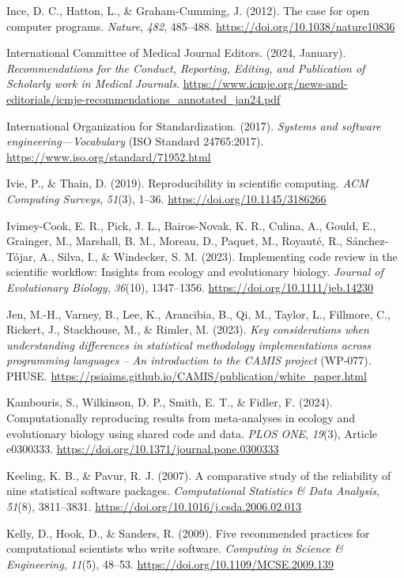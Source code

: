 \documentclass[authordate, meta]{jote-new-article}
\begin{document}
	Ince, D. C., Hatton, L., \& Graham-Cumming, J. (2012). The case for open computer programs. \emph{Nature}, \emph{482}, 485--488. \url{https://doi.org/10.1038/nature10836}


	International Committee of Medical Journal Editors. (2024, January). \emph{Recommendations for the Conduct, Reporting, Editing, and Publication of Scholarly work in Medical Journals}. \url{https://www.icmje.org/news-and-editorials/icmje-recommendations\_annotated\_jan24.pdf}


	International Organization for Standardization. (2017). \emph{Systems and software engineering—Vocabulary} (ISO Standard 24765:2017). \url{https://www.iso.org/standard/71952.html}


	Ivie, P., \& Thain, D. (2019). Reproducibility in scientific computing. \emph{ACM Computing Surveys}, \emph{51}(3), 1--36. \url{https://doi.org/10.1145/3186266}


	Ivimey-Cook, E. R., Pick, J. L., Bairos-Novak, K. R., Culina, A., Gould, E., Grainger, M., Marshall, B. M., Moreau, D., Paquet, M., Royauté, R., Sánchez-Tójar, A., Silva, I., \& Windecker, S. M. (2023). Implementing code review in the scientific workflow: Insights from ecology and evolutionary biology. \emph{Journal of Evolutionary Biology}, \emph{36}(10), 1347--1356. \url{https://doi.org/10.1111/jeb.14230}


	Jen, M.-H., Varney, B., Lee, K., Arancibia, B., Qi, M., Taylor, L., Fillmore, C., Rickert, J., Stackhouse, M., \& Rimler, M. (2023). \emph{Key considerations when understanding differences in statistical methodology implementations across programming languages -- An introduction to the CAMIS project} (WP-077). PHUSE. \url{https://psiaims.github.io/CAMIS/publication/white\_paper.html}


	Kambouris, S., Wilkinson, D. P., Smith, E. T., \& Fidler, F. (2024). Computationally reproducing results from meta-analyses in ecology and evolutionary biology using shared code and data. \emph{PLOS ONE}, \emph{19}(3), Article e0300333. \url{https://doi.org/10.1371/journal.pone.0300333}


	Keeling, K. B., \& Pavur, R. J. (2007). A comparative study of the reliability of nine statistical software packages. \emph{Computational Statistics \& Data Analysis}, \emph{51}(8), 3811--3831. \url{https://doi.org/10.1016/j.csda.2006.02.013}


	Kelly, D., Hook, D., \& Sanders, R. (2009). Five recommended practices for computational scientists who write software. \emph{Computing in Science \& Engineering}, \emph{11}(5), 48--53. \url{https://doi.org/10.1109/MCSE.2009.139}
\end{document}
